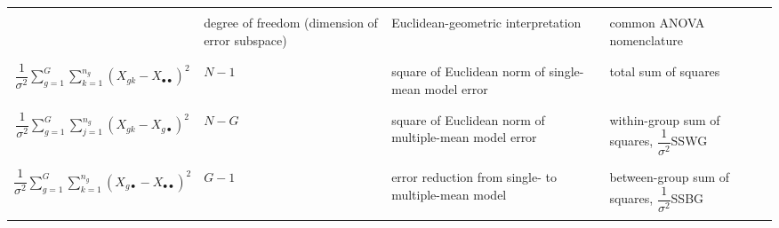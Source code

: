\begin{remark}
\begin{center}
\begin{tabular}{|c|p{2.5cm}|p{3.90cm}|p{2.75cm}|}
\hline
&&&\\
& degree of freedom (dimension of error subspace) & Euclidean-geometric interpretation & common ANOVA nomenclature \\
&&&\\
\hline\hline
&&&\\
$\dfrac{1}{\sigma^{2}}\sum_{g=1}^{G}\sum_{k=1}^{n_{g}}\left(X_{gk} - X_{\bullet\bullet}\right)^{2}$ & $N - 1$ & square of Euclidean norm of single-mean model error & total sum of squares \\
&&&\\
\hline
&&&\\
$\dfrac{1}{\sigma^{2}}\sum_{g=1}^{G}\sum_{j=1}^{n_{g}}\left(X_{gk}-X_{g\bullet}\right)^{2}$ & $N - G$ & square of Euclidean norm of multiple-mean model error & within-group sum of squares, $\dfrac{1}{\sigma^{2}}$SSWG \\
&&&\\
\hline
&&&\\
$\dfrac{1}{\sigma^{2}}\sum_{g=1}^{G} \sum_{k=1}^{n_{g}} \left(X_{g\bullet} - X_{\bullet\bullet}\right)^{2}$ & $G - 1$ & error reduction from single- to multiple-mean model & between-group sum of squares, $\dfrac{1}{\sigma^{2}}$SSBG \\
&&&\\
\hline
\end{tabular}
\end{center}
\end{remark}
